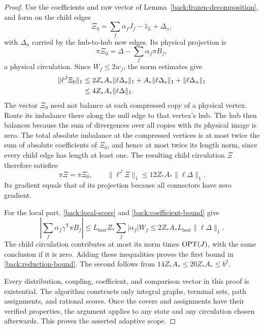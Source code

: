 \begin{proof}
Use the coefficients and raw vector of
Lemma~\ref{back:frozen-decomposition}, and form on the child edges
\begin{equation}
\label{back:child-vector}
                  \Xi_0=\sum_f\alpha_fJ_f-\widehat z_L+\Delta_n,
\end{equation}
with $\Delta_n$ carried by the hub-to-hub new edges.  Its physical
projection is
\[
                \pi\Xi_0=\Delta-\sum_f\alpha_f\pi B_f,
\]
a physical circulation.  Since $W_f\le2w_f$, the norm estimates give
\begin{align}
 \|\ell^J\Xi_0\|_1
 &\le 2Z_*A_*\|\ell\Delta_s\|_1
            +A_*\|\ell\Delta_s\|_1+\|\ell\Delta_n\|_1\notag\\
 &\le4Z_*A_*\|\ell\Delta\|_1.
                                    \label{back:child-norm-before}
\end{align}
The vector $\Xi_0$ need not balance at each compressed copy of a
physical vertex.  Route its imbalance there along the null edge to
that vertex's hub.  The hub then balances because the sum of
divergences over all copies with its physical image is zero.
The total absolute imbalance at the compressed vertices is at most
twice the sum of absolute coefficients of $\Xi_0$, and hence at
most twice its length norm, since every child edge has length at
least one.  The resulting child circulation $\Xi$ therefore satisfies
\begin{equation}
\label{back:child-norm-after}
 \pi\Xi=\pi\Xi_0,\qquad
              \|\ell^J\Xi\|_1\le12Z_*A_*\|\ell\Delta\|_1.
\end{equation}
Its gradient equals that of its projection because all connectors
have zero gradient.

For the local part, \eqref{back:local-score} and
\eqref{back:coefficient-bound} give
\[
 \left|\sum_f\alpha_f\gamma^{\mathsf T}\pi B_f\right|
 \le L_{\mathrm{best}}Z_*\sum_f|\alpha_f|W_f
 \le2Z_*A_*L_{\mathrm{best}}\|\ell\Delta\|_1.
\]
The child circulation contributes at most its norm times $\operatorname{OPT}(J)$,
with the same conclusion if it is zero.  Adding these inequalities
proves the first bound in \eqref{back:reduction-bound}.  The second
follows from $14Z_*A_*\le20Z_*A_*\le b^2$.

Every distribution, coupling, coefficient, and comparison vector
in this proof is existential.  The algorithm constructs only
integral graphs, terminal sets, path assignments, and rational
scores.  Once the covers and assignments have their verified
properties, the argument applies to any state and any circulation
chosen afterwards.  This proves the asserted adaptive scope.
\end{proof}

